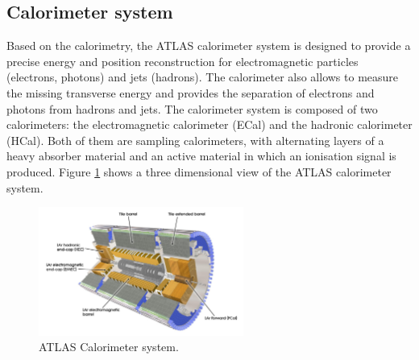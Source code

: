 \subsection{Calorimeter system}
\label{chap2:ATLAS:Calo}

Based on the calorimetry, the ATLAS calorimeter system is designed to provide a precise energy and position reconstruction for electromagnetic particles (electrons, photons) and jets (hadrons). The calorimeter also allows to measure the missing transverse energy and provides the separation of electrons and photons from hadrons and jets. The calorimeter system is composed of two calorimeters: the electromagnetic calorimeter (ECal) and the hadronic calorimeter (HCal). Both of them are sampling calorimeters, with alternating layers of a heavy absorber material and an active material in which an ionisation signal is produced. Figure \ref{fig:chap2:ATLAS:Calo} shows a three dimensional view of the ATLAS calorimeter system.
\begin{figure}[H]
    \centering
    \includegraphics[width=0.6\textwidth]{Ch2/Img/Calo.png}
    \caption{ATLAS Calorimeter system.}
    \label{fig:chap2:ATLAS:Calo}
\end{figure}

